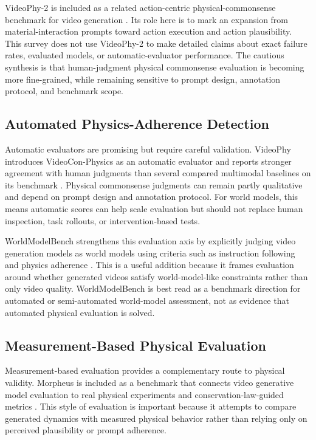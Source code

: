 VideoPhy-2 is included as a related action-centric physical-commonsense benchmark for video generation \cite{bansal2025videophy2_prov}. Its role here is to mark an expansion from material-interaction prompts toward action execution and action plausibility. This survey does not use VideoPhy-2 to make detailed claims about exact failure rates, evaluated models, or automatic-evaluator performance. The cautious synthesis is that human-judgment physical commonsense evaluation is becoming more fine-grained, while remaining sensitive to prompt design, annotation protocol, and benchmark scope.

\subsection{Automated Physics-Adherence Detection}

Automatic evaluators are promising but require careful validation. VideoPhy introduces VideoCon-Physics as an automatic evaluator and reports stronger agreement with human judgments than several compared multimodal baselines on its benchmark \cite{bansal2025_videophy_prov}. Physical commonsense judgments can remain partly qualitative and depend on prompt design and annotation protocol. For world models, this means automatic scores can help scale evaluation but should not replace human inspection, task rollouts, or intervention-based tests.

WorldModelBench strengthens this evaluation axis by explicitly judging video generation models as world models using criteria such as instruction following and physics adherence \cite{li2025worldmodelbench_prov}. This is a useful addition because it frames evaluation around whether generated videos satisfy world-model-like constraints rather than only video quality. WorldModelBench is best read as a benchmark direction for automated or semi-automated world-model assessment, not as evidence that automated physical evaluation is solved.

\subsection{Measurement-Based Physical Evaluation}

Measurement-based evaluation provides a complementary route to physical validity. Morpheus is included as a benchmark that connects video generative model evaluation to real physical experiments and conservation-law-guided metrics \cite{zhang2025morpheus_prov}. This style of evaluation is important because it attempts to compare generated dynamics with measured physical behavior rather than relying only on perceived plausibility or prompt adherence.

